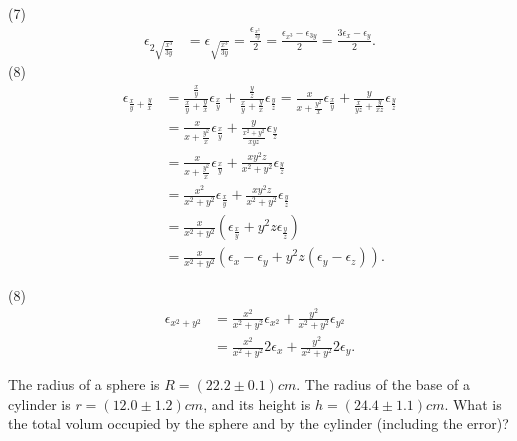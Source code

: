 \documentclass[10pt]{article}
\begin{document}
\begin{solution}[1]
(7)
\begin{align*}
\epsilon _{2 \sqrt{ \frac{x^{3}}{3y}}}  &  = \epsilon _{\sqrt{ \frac{x^{3}}{3y}}}
= \frac{\epsilon _{\frac{x^{3}}{3y}}}{2} = \frac{\epsilon _{x^{3}} - \epsilon _{3y}}{2}
= \frac{3 \epsilon _{x} - \epsilon _{y}}{2} 
.
\end{align*}
(8)
\begin{align*}
\epsilon _{\frac{x}{y} + \frac{y}{x}}  &
= \frac{\frac{x}{y}}{\frac{x}{y} + \frac{y}{x}} \epsilon _{\frac{x}{y}}
+ \frac{\frac{y}{z}}{\frac{x}{y} + \frac{y}{x}} \epsilon _{\frac{y}{z}}
= \frac{x}{x + \frac{y ^2}{x}} \epsilon _{\frac{x}{y}}
+ \frac{y}{\frac{x}{yz} + \frac{y}{xz}} \epsilon _{\frac{y}{z}} \\
& = 
\frac{x}{x + \frac{y ^2}{x}} \epsilon _{\frac{x}{y}}
+ \frac{y}{\frac{x^2 + y ^2}{xyz}} \epsilon _{\frac{y}{z}} \\
& = 
\frac{x}{x + \frac{y ^2}{x}} \epsilon _{\frac{x}{y}}
+ \frac{x y ^2 z}{x^2 + y ^2} \epsilon _{\frac{y}{z}} \\
& = 
\frac{x ^2}{x ^2 + y ^2} \epsilon _{\frac{x}{y}}
+ \frac{x y ^2 z}{x^2 + y ^2} \epsilon _{\frac{y}{z}} \\
& =
\frac{x}{x ^2 + y ^2} (\epsilon _{\frac{x}{y}} + y ^2 z \epsilon _{\frac{y}{z}}) \\
& =
\frac{x}{x ^2 + y ^2} (\epsilon _{x} - \epsilon _{y} + y ^2 z (\epsilon _{y} - \epsilon _{z}))
.
\end{align*}

(8)
\begin{align*}
\epsilon _{x^2 + y^2}  &   = \frac{x ^2}{x^2 + y ^2} \epsilon _{x ^2} + \frac{y ^2}{x ^2 + y^2} \epsilon _{y ^2} \\
& = \frac{x ^2}{x^2 + y ^2} 2\epsilon _{x} + \frac{y ^2}{x ^2 + y^2} 2\epsilon _{y}
.
\end{align*}
\end{solution}
\begin{exercise}[2]  \label{exe:2}
The radius of a sphere is \(R = (22.2 \pm 0.1)cm\). The radius
of the base of a cylinder is \(r= (12.0 \pm 1.2)cm\), and its
height is \(h=(24.4 \pm 1.1)cm\). What is the total volum
occupied by the sphere and by the cylinder (including the error)?
\end{exercise}
\end{document}
